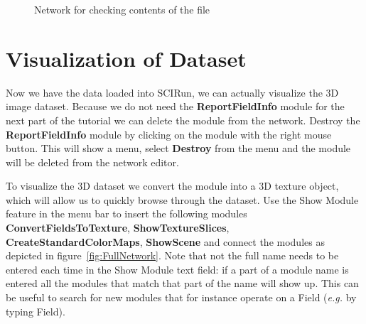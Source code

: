 \documentclass[fleqn,11pt,openany]{book}
\begin{document}
\begin{figure}
\caption{Network for checking contents of the file}\label{fig:FirstNetwork}
\end{figure}
 
\section{Visualization of Dataset}
 
Now we have the data loaded into SCIRun, we can actually visualize the 3D image dataset. Because we do not need the {\bf ReportFieldInfo} module for the next part of the tutorial we can delete the module from the network. Destroy the {\bf ReportFieldInfo} module by clicking on the module with the right mouse button. This will show a menu, select {\bf Destroy} from the menu and the module will be deleted from the network editor.  
 
To visualize the 3D dataset we convert the module into a 3D texture object, which will allow us to quickly browse through the dataset. Use the Show Module feature in the menu bar to insert the following modules {\bf ConvertFieldsToTexture}, {\bf ShowTextureSlices}, {\bf CreateStandardColorMaps}, {\bf ShowScene} and connect the modules as depicted in figure~\ref{fig:FullNetwork}. Note that not the full name needs to be entered each time in the Show Module text field: if a part of a module name is entered all the modules that match that part of the name will show up. This can be useful to search for new modules that for instance operate on a Field ({\em e.g.} by typing Field).
\end{document}
